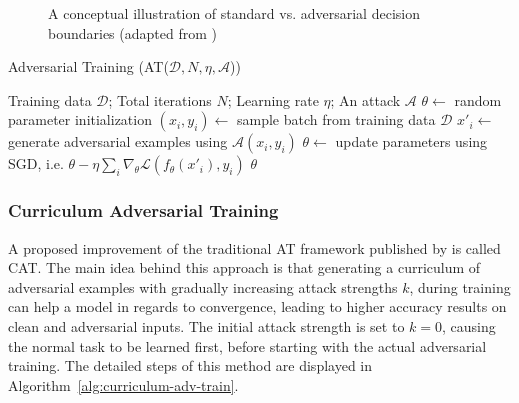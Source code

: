 \begin{figure}[H]
	\centering
	\hspace{0.5cm}
	\hspace{0.5cm}
	\caption{A conceptual illustration of standard vs. adversarial decision boundaries (adapted from \cite{madry2017towards})}
	\label{fig:adv-boundary}
\end{figure}
\begin{algorithm}[H]
	\caption{Adversarial Training (AT($\mathcal{D}, N, \eta, \mathcal{A}$))}
	\label{alg:adv-train}
	\begin{algorithmic}[1]
		\Require Training data $\mathcal{D}$; Total iterations $N$; Learning rate $\eta$;
		\Require An attack $\mathcal{A}$
		\State $\theta \gets$ random parameter initialization
			\State $(x_i,y_i) \gets$ sample batch from training data $\mathcal{D}$
			\State $x'_i \gets$ generate adversarial examples using $\mathcal{A}(x_i, y_i)$
			\State $\theta \gets$ update parameters using SGD, i.e. $\theta - \eta \sum_i \nabla_\theta \mathcal{L}(f_\theta(x'_i), y_i)$
		\EndFor
		\State \Return $\theta$
	\end{algorithmic}
\end{algorithm}

\subsubsection{Curriculum Adversarial Training}
A proposed improvement of the traditional \ac{AT} framework published by \cite{cai2018curriculum} is called \acl{CAT}. The main idea behind this approach is that generating a curriculum of adversarial examples with gradually increasing attack strengths $k$, during training can help a model in regards to convergence, leading to higher accuracy results on clean and adversarial inputs. The initial attack strength is set to $k=0$, causing the normal task to be learned first, before starting with the actual adversarial training. The detailed steps of this method are displayed in Algorithm~\ref{alg:curriculum-adv-train}.

